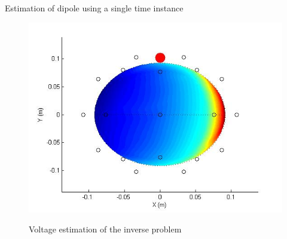 \documentclass[t,12pt,english
\ifx\beamermode\undefined\else,\beamermode\fi
]{beamer}
\begin{document}
\begin{frame}{Estimation of dipole using a single time instance}
\begin{figure}[!htbp]
\endminipage\hfill
{}%
\centering
\includegraphics[width=1\textwidth]{18.jpg}

\endminipage\hfill
\tiny{Voltage estimation of the inverse problem}
\end{figure}
    
\end{frame}
\end{document}
